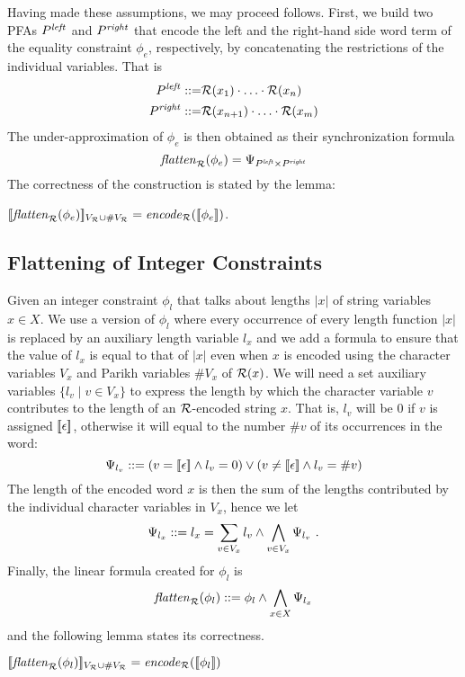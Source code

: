 \documentclass[sigplan,review,anonymous]{acmart}\settopmatter{printfolios=true,printccs=false,printacmref=false}
\begin{document}
Having made these assumptions, we may proceed follows. First, we build two PFAs $P^{\mathit{left}}$ and $P^{\mathit{right}}$ that encode the left and the right-hand side word term of the equality constraint $\phi_e$, respectively, by concatenating the restrictions of the individual variables. That is
\begin{eqnarray*}
P^{\mathit{left}} ::=& \mathcal{R}(x_1)\cdot\ldots \cdot \mathcal{R}(x_n)\\
P^{\mathit{right}} ::=& \mathcal{R}(x_{n+1})\cdot\ldots \cdot \mathcal{R}(x_m)
\end{eqnarray*}
The under-approximation of $\phi_e$ is then obtained as their synchronization formula
$$
\mathit{flatten}_{\mathcal{R}}(\phi_e) = \Psi_{P^{\mathit{left}} \times P^{\mathit{right}}}
$$
The correctness of the construction is stated by the lemma:
\begin{lemma}\label{lemma:eqcorrect}
$[\![\mathit{flatten}_{\mathcal{R}}(\phi_e)]\!]_{V_{\mathcal{R}}  \cup \#V_{\mathcal{R}}} = \mathit{encode}_{\mathcal{R}} ([\![\phi_e]\!])$.
\end{lemma}

\subsection{Flattening of Integer Constraints}
{
\newcommand{\lx}{l_x}
\newcommand{\lv}{l_v}
Given an integer constraint $\phi_l$ that talks about lengths $|x|$ of string variables $x\in X$. 
We use a version of $\phi_l$ where every occurrence of every length function $|x|$ is replaced by an auxiliary length variable $\lx$ and we add a formula to ensure that the value of $\lx$ is equal to that of $|x|$ even when $x$ is encoded using the character variables $V_x$ and Parikh variables $\# V_x$ of $\mathcal{R}(x)$.
%
We will need a set auxiliary variables $\{l_v\mid v\in V_x\}$ to express the length by which the character variable $v$ contributes to the length of an $\mathcal{R}$-encoded string $x$. 
That is, $\lv$ will be $0$ if $v$ is assigned $[\![\epsilon]\!]$,
otherwise it will equal to the number $\#v$ of its occurrences in the word:
$$
\Psi_{\lv} \defeq (v = \noepsilon \land l_v=0) \lor (v \neq \noepsilon \land l_v = \# v)
$$
The length of the encoded word $x$ is then the sum of the lengths contributed by the individual character variables in $V_x$, 
hence we let 
$$
\Psi_{\lx} \defeq \lx = \sum_{v\in V_x} l_v \land  \bigwedge_{v\in V_x} \Psi_{\lv}\ .
$$
Finally, the linear formula created for $\phi_l$ is 
$$
\underf \dr {\phi_{l}} \defeq \phi_l \land \bigwedge_{x\in X} \Psi_{\lx}
$$
and the following lemma states its correctness.
}
\begin{lemma}\label{lemma:eqcorrect}
$[\![\mathit{flatten}_{\mathcal{R}}(\phi_l)]\!]_{V_{\mathcal{R}}  \cup \#V_{\mathcal{R}}} = \mathit{encode}_{\mathcal{R}} ([\![\phi_l]\!])$
\end{lemma}
\end{document}
